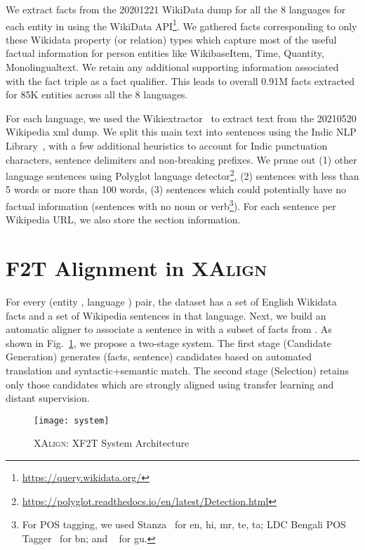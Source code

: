 \documentclass[11pt]{article}
\def\langCount{8}
\begin{document}
We extract facts from the 20201221 WikiData dump for all the \langCount{} languages for each entity in  using the WikiData API\footnote{\url{https://query.wikidata.org/}}. We gathered facts corresponding to only these Wikidata property (or relation) types which capture most of the useful factual information for person entities like WikibaseItem, Time, Quantity, Monolingualtext. We retain any additional supporting information associated with the fact triple as a fact qualifier. This leads to overall  0.91M facts extracted for 85K entities across all the \langCount{} languages. 

For each language, we used the Wikiextractor~\cite{Wikiextractor2015} to extract text from the 20210520 Wikipedia xml dump. We split this main text into sentences using the Indic NLP Library~\cite{kunchukuttan2020indicnlp}, with a few additional heuristics to account for Indic punctuation characters, sentence delimiters and non-breaking prefixes. We prune out (1) other language sentences using Polyglot language detector\footnote{\url{https://polyglot.readthedocs.io/en/latest/Detection.html}}, (2)  sentences with less than 5 words or more than 100 words, (3) sentences which could potentially have no factual information (sentences with no noun or verb\footnote{For POS tagging, we used Stanza~\cite{qi2020stanza} for en, hi, mr, te, ta; LDC Bengali POS Tagger~\cite{bali2010indian} for bn; and ~\cite{patel2008part} for gu.}). For each sentence per Wikipedia URL, we also store the section information.

\section{F2T Alignment in \textsc{XAlign}}
\label{sec:alignment}
For every (entity , language ) pair, the dataset has a set  of English Wikidata facts and a set of Wikipedia sentences  in that language. Next, we build an automatic aligner to associate a sentence in  with a subset of facts from . As shown in Fig.~\ref{fig:system}, we propose a two-stage system. The first stage (Candidate Generation) generates (facts, sentence) candidates based on automated translation and syntactic+semantic match. The second stage (Selection) retains only those candidates which are strongly aligned using transfer learning and distant supervision.

\begin{figure}[!t]
    \centering
    \texttt{[image: system]}
    \caption{\textsc{XAlign}: XF2T System Architecture}
    \label{fig:system}
\end{figure}
\end{document}
